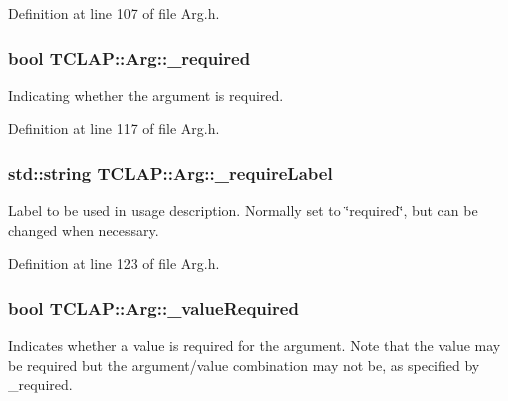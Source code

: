 Definition at line 107 of file Arg.\+h.

\hypertarget{class_t_c_l_a_p_1_1_arg_ad16408bd1ca4d8b1d14d6c5129545a84}{}
\subsubsection[{\+\_\+required}]{\setlength{\rightskip}{0pt plus 5cm}bool T\+C\+L\+A\+P\+::\+Arg\+::\+\_\+required\hspace{0.3cm}{\ttfamily [protected]}}\label{class_t_c_l_a_p_1_1_arg_ad16408bd1ca4d8b1d14d6c5129545a84}
Indicating whether the argument is required. 

Definition at line 117 of file Arg.\+h.

\hypertarget{class_t_c_l_a_p_1_1_arg_a2ed097a868e34a0c4f6062ead744ac54}{}
\subsubsection[{\+\_\+require\+Label}]{\setlength{\rightskip}{0pt plus 5cm}std\+::string T\+C\+L\+A\+P\+::\+Arg\+::\+\_\+require\+Label\hspace{0.3cm}{\ttfamily [protected]}}\label{class_t_c_l_a_p_1_1_arg_a2ed097a868e34a0c4f6062ead744ac54}
Label to be used in usage description. Normally set to \char`\"{}required\char`\"{}, but can be changed when necessary. 

Definition at line 123 of file Arg.\+h.

\hypertarget{class_t_c_l_a_p_1_1_arg_a776682b7e19f4dc231bbad3d10034dfa}{}
\subsubsection[{\+\_\+value\+Required}]{\setlength{\rightskip}{0pt plus 5cm}bool T\+C\+L\+A\+P\+::\+Arg\+::\+\_\+value\+Required\hspace{0.3cm}{\ttfamily [protected]}}\label{class_t_c_l_a_p_1_1_arg_a776682b7e19f4dc231bbad3d10034dfa}
Indicates whether a value is required for the argument. Note that the value may be required but the argument/value combination may not be, as specified by \+\_\+required. 

